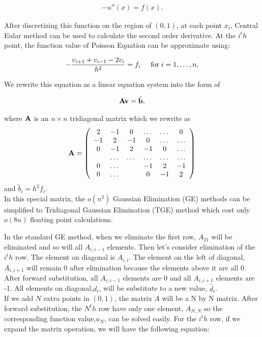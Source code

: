 \documentclass{article}
\begin{document}
\begin{align}
-u''(x) = f(x). 
\end{align}

After discretizing this function on the region of $(0, 1)$, at each point $x_i$, Central Eular method can be used to calculate the second order derivative. At the $i^th$ point, the function value of Poisson Equation can be approximate using:

\begin{align}
   -\frac{v_{i+1}+v_{i-1}-2v_i}{h^2} = f_i  \hspace{0.5cm} \mathrm{for} \hspace{0.1cm} i=1,\dots, n,
\end{align}

We rewrite this equation as a linear equation system into the form of

\begin{align}
{\bf A}{\bf v} = \tilde{{\bf b}},
\end{align}

where ${\bf A}$ is an $n\times n$  tridiagonal matrix which we rewrite as 
\begin{equation}
{\bf A} = \left(\begin{array}{cccccc}
2& -1& 0 &\dots   & \dots &0 \\
-1 & 2 & -1 &0 &\dots &\dots \\
0&-1 &2 & -1 & 0 & \dots \\
& \dots   & \dots &\dots   &\dots & \dots \\
0&\dots   &  &-1 &2& -1 \\
0&\dots    &  & 0  &-1 & 2 \\
\end{array} \right)
\end{equation}
and $\tilde{b}_i=h^2f_i$.\\

In this special matrix, the $o(n^3)$ Gaussian Elimination (GE) methods can be simplified to Tridiagonal Gaussian Elimination (TGE) method which cost only $o(8n)$ floating point calculations.

In the standard GE method, when we eliminate the first row, $A_{21}$ will be eliminated and so will all $A_{i,i-1}$ elements. Then let's consider elimination of the  $i^th$ row. The element on diagonal is $A_{i,i}$. The element on the left of diagonal, $A_{i,i+1}$ will remain 0 after elimination because the elements above it are all 0. After forward substitution, all $A_{i,i-1}$ elements are 0 and all $A_{i,i+1}$ elements are -1. All elements on diagonal,$d_i$, will be substitute to a new value, $\tilde{{d_i}}$. \\
If we add $N$ extra points in $(0,1)$, the matrix $A$ will be a N by N matrix. After forward substitution, the $N^th$ row have only one element, $A_{N,N}$ so the corresponding function value,$u_{N}$, can be solved easily. For the $i^th$ row, if we expand the matrix operation, we will have the following equation:
\end{document}
